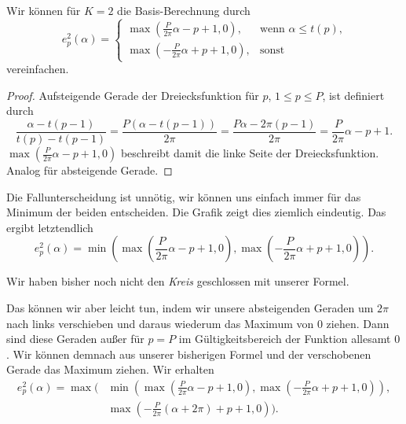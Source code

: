 Wir können für $K=2$ die Basis-Berechnung durch
\begin{equation}
  e_p^2\left(\alpha\right) = \begin{cases}
    \max\left(\frac{P}{2\pi} \alpha - p + 1, 0\right), & \text{wenn }\alpha \leq t\left(p\right)\text{,}\\
    \max\left(-\frac{P}{2\pi} \alpha + p + 1, 0\right), & \text{sonst}
  \end{cases}
\end{equation}
vereinfachen.

\begin{proof}
  Aufsteigende Gerade der Dreiecksfunktion für $p$, $1 \leq p \leq P$, ist definiert durch
  \begin{equation}
    \frac{\alpha - t\left(p-1\right)}{t\left(p\right) - t\left(p-1\right)} = \frac{P\left(\alpha - t\left(p-1\right)\right)}{2\pi} = \frac{P\alpha - 2\pi\left(p-1\right)}{2\pi} = \frac{P}{2\pi}\alpha - p + 1.
  \end{equation}
  $\max \left(\frac{P}{2\pi} \alpha - p + 1, 0\right)$ beschreibt damit die linke Seite der Dreiecksfunktion.
  Analog für absteigende Gerade.
\end{proof}

Die Fallunterscheidung ist unnötig, wir können uns einfach immer für das Minimum der beiden entscheiden.
Die Grafik zeigt dies ziemlich eindeutig.
Das ergibt letztendlich
\begin{equation}
  e_p^2\left(\alpha\right) = \min \left( \max\left(\frac{P}{2\pi} \alpha - p + 1, 0\right), \max\left(-\frac{P}{2\pi} \alpha + p + 1, 0\right) \right)\text{.}
\end{equation}



Wir haben bisher noch nicht den \emph{Kreis} geschlossen mit unserer Formel.

Das können wir aber leicht tun, indem wir unsere absteigenden Geraden um $2\pi$ nach links verschieben und daraus wiederum das Maximum von $0$ ziehen.
Dann sind diese Geraden außer für $p = P$ im Gültigkeitsbereich der Funktion allesamt $0$.
Wir können demnach aus unserer bisherigen Formel und der verschobenen Gerade das Maximum ziehen.
Wir erhalten
\begin{equation}
\begin{split}
  e_p^2\left(\alpha\right) = \max \biggr( & \min \left( \max\left(\frac{P}{2\pi} \alpha - p + 1, 0\right), \max\left(-\frac{P}{2\pi} \alpha + p + 1, 0\right) \right),\\
  & \max \left(-\frac{P}{2\pi} \left( \alpha + 2\pi \right) + p + 1, 0\right) \biggr)\text{.}
\end{split}
\end{equation}

